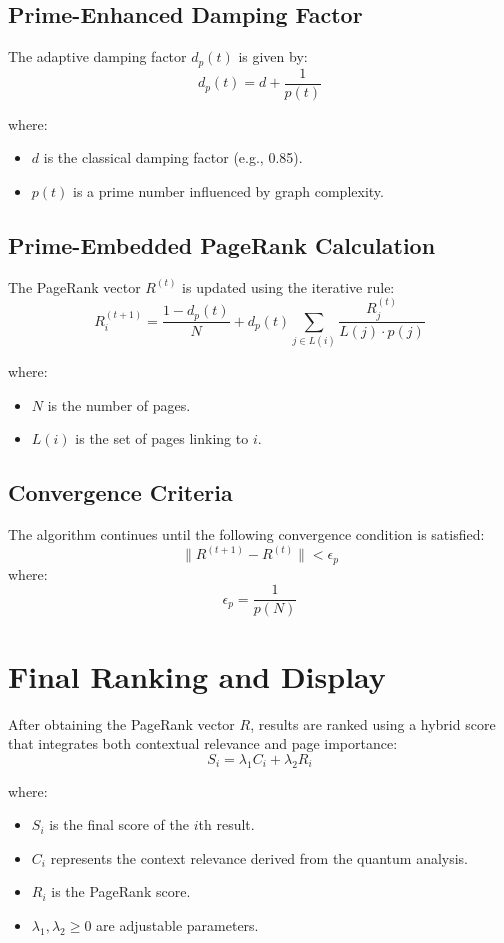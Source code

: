 \documentclass{article}
\theoremstyle{plain}
\theoremstyle{claimstyle}
\begin{document}
\subsection{Prime-Enhanced Damping Factor}
The adaptive damping factor \(d_p(t)\) is given by:
\[
d_p(t) = d + \frac{1}{p(t)}
\]

where:
\begin{itemize}
    \item \(d\) is the classical damping factor (e.g., 0.85).
    \item \( p(t) \) is a prime number influenced by graph complexity.
\end{itemize}

\subsection{Prime-Embedded PageRank Calculation}
The PageRank vector \(R^{(t)}\) is updated using the iterative rule:
\[
R_i^{(t+1)} = \frac{1 - d_p(t)}{N} + d_p(t) \sum_{j \in L(i)} \frac{R_j^{(t)}}{L(j) \cdot p(j)}
\]

where:
\begin{itemize}
    \item \(N\) is the number of pages.
    \item \(L(i)\) is the set of pages linking to \(i\).
\end{itemize}

\subsection{Convergence Criteria}
The algorithm continues until the following convergence condition is satisfied:
\[
\| R^{(t+1)} - R^{(t)} \| < \epsilon_p
\]
where:
\[
\epsilon_p = \frac{1}{p(N)}
\]

\section{Final Ranking and Display}
After obtaining the PageRank vector \(R\), results are ranked using a hybrid score that integrates both contextual relevance and page importance:
\[
S_i = \lambda_1 C_i + \lambda_2 R_i
\]

where:
\begin{itemize}
    \item \(S_i\) is the final score of the \(i\)th result.
    \item \(C_i\) represents the context relevance derived from the quantum analysis.
    \item \(R_i\) is the PageRank score.
    \item \(\lambda_1, \lambda_2 \geq 0\) are adjustable parameters.
\end{itemize}
\end{document}

